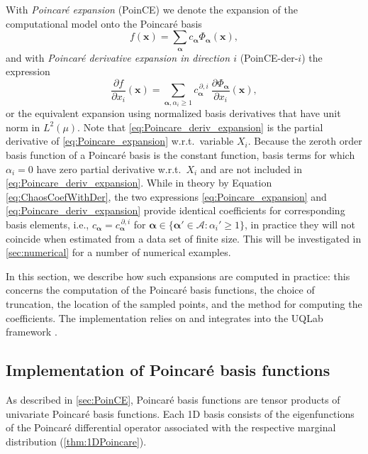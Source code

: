 \documentclass[a4paper,11pt]{article}
\newcommand{\curlyA}{{\mathcal A}}
\newcommand{\ve}[1]{\boldsymbol{#1}}
\newcommand{\alp}{{\ve{\alpha}}}
\newcommand{\Phal}{\Phi_{\alp}}
\renewcommand{\citep}[2][]{\cite[#1]{#2}}
\theoremstyle{definition}
\theoremstyle{remark}
\theoremstyle{theorem}
\begin{document}
With \textit{Poincar\'e expansion} (PoinCE) we denote the expansion of the computational model onto the Poincar\'e basis  
\begin{equation}
f(\ve x) = \sum_{\alp} c_\alp \Phal(\ve x),
\label{eq:Poincare_expansion}
\end{equation}
and with \textit{Poincar\'e derivative expansion in direction $i$} (PoinCE-der-$i$) the expression
\begin{equation}
\frac{\partial f}{\partial x_i}(\ve x) = \sum_{\alp, \alpha_i \geq 1} {c}^{\, \partial, i}_\alp \ \frac{\partial \Phal}{\partial x_i}(\ve x),
\label{eq:Poincare_deriv_expansion}
\end{equation}
or the equivalent expansion using normalized basis derivatives that have unit norm in $L^2(\mu)$.
Note that \eqref{eq:Poincare_deriv_expansion} is the partial derivative of \eqref{eq:Poincare_expansion} w.r.t.\ variable $X_i$. Because the zeroth order basis function of a Poincar\'e basis is the constant function, basis terms for which $\alpha_i = 0$ have zero partial derivative w.r.t.\ $X_i$ and are not included in \eqref{eq:Poincare_deriv_expansion}.
While in theory by Equation \eqref{eq:ChaosCoefWithDer}, the two expressions \eqref{eq:Poincare_expansion} and \eqref{eq:Poincare_deriv_expansion} provide identical coefficients for corresponding basis elements, i.e., $c_\alp = {c}^{\, \partial, i}_\alp$ for $\alp \in \{\alp' \in \curlyA: \alpha_i' \geq 1\}$, in practice they will not coincide when estimated from a data set of finite size.
This will be investigated in \cref{sec:numerical} for a number of numerical examples.


In this section, we describe how such expansions are computed in practice: this concerns the computation of the Poincar\'e basis functions, the choice of truncation, the location of the sampled points, and the method for computing the coefficients.
The implementation relies on and integrates into the UQLab framework \citep{MarelliUQLab2014}.

\subsection{Implementation of Poincar\'e basis functions}
\label{sec:implementation}
As described in \cref{sec:PoinCE}, Poincar\'e basis functions are tensor products of univariate Poincar\'e basis functions. Each 1D basis consists of the eigenfunctions of the Poincar\'e differential operator associated with the respective marginal distribution (\cref{thm:1DPoincare}).
\end{document}
